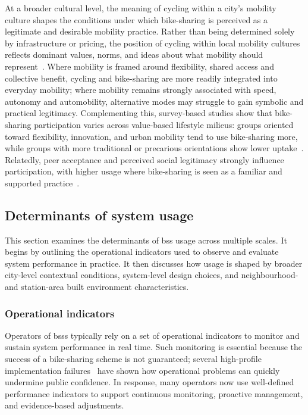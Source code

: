     At a broader cultural level, the meaning of cycling within a city’s mobility culture shapes the conditions under which bike-sharing is perceived as a legitimate and desirable mobility practice. Rather than being determined solely by infrastructure or pricing, the position of cycling within local mobility cultures reflects dominant values, norms, and ideas about what mobility should represent~\cite{Nikolaeva2019}. Where mobility is framed around flexibility, shared access and collective benefit, cycling and bike-sharing are more readily integrated into everyday mobility; where mobility remains strongly associated with speed, autonomy and automobility, alternative modes may struggle to gain symbolic and practical legitimacy. Complementing this, survey-based studies show that bike-sharing participation varies across value-based lifestyle milieus: groups oriented toward flexibility, innovation, and urban mobility tend to use bike-sharing more, while groups with more traditional or precarious orientations show lower uptake~\cite{Borgstedt2019}. Relatedly, peer acceptance and perceived social legitimacy strongly influence participation, with higher usage where bike-sharing is seen as a familiar and supported practice~\cite{Boenigk2019, Georgi2019}.


\subsection{Determinants of system usage}

This section examines the determinants of \ac{bss} usage across multiple scales. It begins by outlining the operational indicators used to observe and evaluate system performance in practice. It then discusses how usage is shaped by broader city-level contextual conditions, system-level design choices, and neighbourhood- and station-area built environment characteristics.

    \subsubsection{Operational indicators}

    Operators of \acp{bss} typically rely on a set of operational indicators to monitor and sustain system performance in real time. Such monitoring is essential because the success of a bike-sharing scheme is not guaranteed; several high-profile implementation failures~\cite{Yle2015_HelsinkiBikeShare} have shown how operational problems can quickly undermine public confidence. In response, many operators now use well-defined performance indicators to support continuous monitoring, proactive management, and evidence-based adjustments.
    
